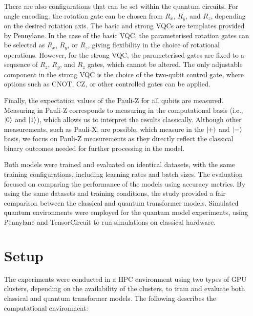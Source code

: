 There are also configurations that can be set within the quantum
circuits. For angle encoding, the rotation gate can be chosen from
\(R_x\), \(R_y\), and \(R_z\), depending on the desired rotation
axis. The basic and strong \glspl{VQC} are templates provided by
Pennylane. In the case of the basic VQC, the parameterised rotation
gates can be selected as \(R_x\), \(R_y\), or \(R_z\), giving
flexibility in the choice of rotational operations. However, for the
strong VQC, the parameterised gates are fixed to a sequence of
\(R_z\), \(R_y\), and \(R_z\) gates, which cannot be altered. The
only adjustable component in the strong VQC is the choice of the
two-qubit control gate, where options such as \gls{CNOT}, CZ,
or other controlled gates can be applied.

Finally, the expectation values of the Pauli-Z for all qubits are measured.
Measuring in Pauli-Z corresponds to measuring in the
computational basis (i.e., \( \ket{0} \) and \( \ket{1} \)), which
allows us to interpret the results classically. Although other
measurements, such as Pauli-X, are possible, which measure in the \(
\ket{+} \) and \( \ket{-} \) basis, we focus on Pauli-Z measurements
as they directly reflect the classical binary outcomes needed for
further processing in the model.

Both models were trained and evaluated on identical datasets, with
the same training configurations, including learning rates and batch
sizes. The evaluation focused on comparing the performance of the models
using accuracy metrics. By using the
same datasets and training conditions, the study provided a fair
comparison between the classical and quantum transformer models.
Simulated quantum environments were employed for the quantum model
experiments, using Pennylane and TensorCircuit to run
simulations on classical hardware.

\section{Setup}
\label{sec:setup}
The experiments were conducted in a \gls{HPC} environment using two
types of GPU clusters, depending on the availability of the clusters,
to train and evaluate both classical and quantum transformer models.
The following describes the computational environment:

